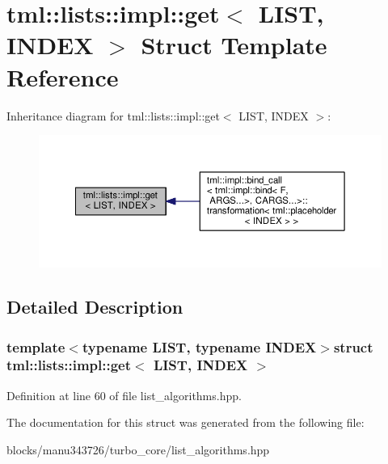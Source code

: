 \hypertarget{structtml_1_1lists_1_1impl_1_1get}{\section{tml\+:\+:lists\+:\+:impl\+:\+:get$<$ L\+I\+S\+T, I\+N\+D\+E\+X $>$ Struct Template Reference}
\label{structtml_1_1lists_1_1impl_1_1get}
}


Inheritance diagram for tml\+:\+:lists\+:\+:impl\+:\+:get$<$ L\+I\+S\+T, I\+N\+D\+E\+X $>$\+:
\nopagebreak
\begin{figure}[H]
\begin{center}
\leavevmode
\includegraphics[width=350pt]{structtml_1_1lists_1_1impl_1_1get__inherit__graph}
\end{center}
\end{figure}


\subsection{Detailed Description}
\subsubsection*{template$<$typename L\+I\+S\+T, typename I\+N\+D\+E\+X$>$struct tml\+::lists\+::impl\+::get$<$ L\+I\+S\+T, I\+N\+D\+E\+X $>$}



Definition at line 60 of file list\+\_\+algorithms.\+hpp.



The documentation for this struct was generated from the following file\+:\begin{DoxyCompactItemize}
\item 
blocks/manu343726/turbo\+\_\+core/list\+\_\+algorithms.\+hpp\end{DoxyCompactItemize}
